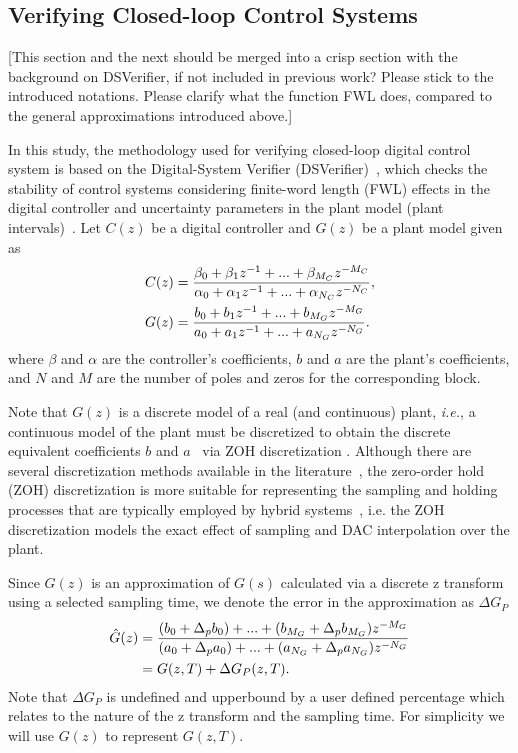 \documentclass{sig-alternate-05-2015}
\newcommand{\red}[1]{{\color{red}#1}}
\begin{document}
\subsection{Verifying Closed-loop Control Systems}
\label{verifying-closed-loop-control-systems}

\red{[This section and the next should be merged into a crisp section with the background on DSVerifier, if not included in previous work? 
Please stick to the introduced notations. Please clarify what the function FWL does, compared to the general approximations introduced above.]}

In this study, the methodology used for verifying closed-loop digital
control system is based on the Digital-System Verifier
(DSVerifier)~\cite{IsmailBCFF15}, which checks the stability of control
systems considering finite-word length (FWL) effects in the digital
controller and uncertainty parameters in the plant model (plant
intervals)~\cite{Bessa16}.  Let $C(z)$ be a digital controller and $G(z)$ be
a plant model given as
%
\begin{align}
\small
\label{controller_plant_tf}
C(z)&=\frac{\beta_{0}+\beta_{1}z^{-1}+...+\beta_{M_C}z^{-M_C}}{\alpha_{0}+\alpha_{1}z^{-1}+...+\alpha_{N_C}z^{-N_C}}, \\
G(z)&=\frac{b_{0}+b_{1}z^{-1}+...+b_{M_G}z^{-M_G}}{a_{0}+a_{1}z^{-1}+...+a_{N_G}z^{-N_G}}.
\end{align}
%
\noindent where $\beta$ and $\alpha$ are the controller's coefficients, $b$
and $a$ are the plant's coefficients, and $N$ and $M$ are the number of poles and zeros for the corresponding block.  

Note that $G(z)$ is a
discrete model of a real (and continuous) plant, {\it i.e.}, a continuous
model of the plant must be discretized to obtain the discrete equivalent
coefficients $b$ and $a$~\cite{Astrom08} via ZOH discretization %
. Although there are several discretization methods available in the literature~\cite{Franklin15}, the
zero-order hold (ZOH) discretization is more suitable for representing the
sampling and holding processes that are typically employed by hybrid
systems~\cite{istepanian2012digital}, i.e. the ZOH discretization models the exact effect of sampling and DAC interpolation over the plant.

Since $G(z)$ is an approximation of $G(s)$ calculated via a discrete z transform using a selected sampling time, we denote the error in the approximation as $\Delta{G}_P$
\begin{align}
\small
\label{parametric_plant_tf}
\hat{G}(z)&=\frac{(b_{0}+\Delta_p b_{0}) +...+(b_{M_G}+\Delta_p b_{M_G})z^{-M_G}}{(a_{0}+\Delta_p a_{0})+...+(a_{N_G}+\Delta_p a_{N_G})z^{-N_G}} \nonumber \\
&=G(z,T)+\Delta{G}_P(z,T).
\end{align}
Note that $\Delta{G}_P$ is undefined and upperbound by a user defined percentage which relates to the nature of the z transform and the sampling time. For simplicity we will use $G(z)$ to represent $G(z,T)$.
\end{document}
